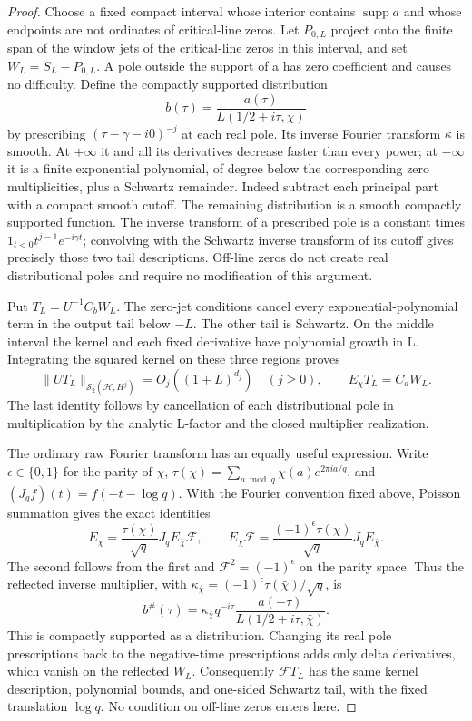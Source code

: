 \begin{proof}
Choose a fixed compact interval whose interior contains
$\operatorname{supp}a$ and whose endpoints are not ordinates of
critical-line zeros.  Let $P_{0,L}$ project onto the finite span of
the window jets of the critical-line zeros in this interval, and set
$W_L=S_L-P_{0,L}$.  A pole outside the support of a has zero coefficient
and causes no difficulty.  Define the compactly supported distribution
\[
 b(\tau)=\frac{a(\tau)}{L(1/2+i\tau,\chi)}
\]
by prescribing $(\tau-\gamma-i0)^{-j}$ at each real pole.
Its inverse Fourier transform $\kappa$ is smooth.  At $+\infty$ it
and all its derivatives decrease faster than every power; at
$-\infty$ it is a finite exponential polynomial, of degree below
the corresponding zero multiplicities, plus a Schwartz remainder.
Indeed subtract each principal part with a compact smooth cutoff.
The remaining distribution is a smooth compactly supported function.
The inverse transform of a prescribed pole is a constant times
$1_{t<0}t^{j-1}e^{-i\gamma t}$; convolving with the Schwartz inverse
transform of its cutoff gives precisely those two tail descriptions.
Off-line zeros do not create real distributional poles and require
no modification of this argument.

Put $T_L=U^{-1}C_bW_L$.  The zero-jet conditions cancel every
exponential-polynomial term in the output tail below $-L$.
The other tail is Schwartz.  On the middle interval the kernel and
each fixed derivative have polynomial growth in L.
Integrating the squared kernel on these three regions proves
\[
 \|UT_L\|_{\mathcal S_2(\mathcal H,H^j)}=O_j((1+L)^{d_j})
 \quad(j\geq0),\qquad E_\chi T_L=C_aW_L.
\]
The last identity follows by cancellation of each distributional
pole in multiplication by the analytic L-factor and the closed
multiplier realization.

The ordinary raw Fourier transform has an equally useful expression.
Write $\epsilon\in\{0,1\}$ for the parity of $\chi$,
$\tau(\chi)=\sum_{a\bmod q}\chi(a)e^{2\pi ia/q}$, and
$(J_qf)(t)=f(-t-\log q)$. With the Fourier convention fixed above,
Poisson summation gives the exact identities
\[
 E_\chi=\frac{\tau(\chi)}{\sqrt q}J_qE_{\bar\chi}\mathcal F,
 \qquad
 E_\chi\mathcal F
   =\frac{(-1)^\epsilon\tau(\chi)}{\sqrt q}J_qE_{\bar\chi}.
\]
The second follows from the first and
$\mathcal F^2=(-1)^\epsilon$ on the parity space. Thus the
reflected inverse multiplier, with
$\kappa_{\bar\chi}=(-1)^\epsilon\tau(\bar\chi)/\sqrt q$, is
\[
 b^\#(\tau)=\kappa_{\bar\chi}q^{-i\tau}
                 \frac{a(-\tau)}{L(1/2+i\tau,\bar\chi)}.
\]
This is compactly supported as a distribution. Changing its real
pole prescriptions back to the negative-time prescriptions adds
only delta derivatives, which vanish on the reflected $W_L$.
Consequently $\mathcal FT_L$ has the same kernel description,
polynomial bounds, and one-sided Schwartz tail, with the fixed
translation $\log q$. No condition on off-line zeros enters here.


\end{proof}
